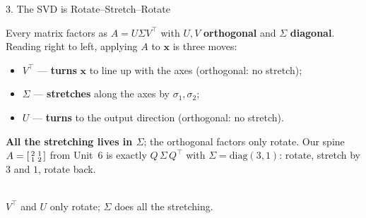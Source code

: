 \documentclass[10pt]{article}
\newcommand{\xx}{\mathbf{x}}
\newcommand{\T}{^{\top}}
\begin{document}
\begin{notesbox}{3. The SVD is Rotate--Stretch--Rotate}
\begin{minipage}[t]{0.52\linewidth}\vspace{0pt}
Every matrix factors as $A=U\Sigma V\T$ with $U,V$ \textbf{orthogonal} and $\Sigma$ \textbf{diagonal}. Reading
right to left, applying $A$ to $\xx$ is three moves:
\begin{itemize}[leftmargin=1.2em, nosep]
  \item $V\T$ --- \textbf{turns} $\xx$ to line up with the axes (orthogonal: no stretch);
  \item $\Sigma$ --- \textbf{stretches} along the axes by $\sigma_1,\sigma_2$;
  \item $U$ --- \textbf{turns} to the output direction (orthogonal: no stretch).
\end{itemize}
\vspace{2pt}
\textbf{All the stretching lives in $\Sigma$}; the orthogonal factors only rotate. Our spine
$A=\begin{bsmallmatrix} 2 & 1\\ 1 & 2 \end{bsmallmatrix}$ from Unit~6 is exactly
$Q\,\Sigma\,Q\T$ with $\Sigma=\mathrm{diag}(3,1)$: rotate, stretch by $3$ and $1$, rotate back.
\end{minipage}\hfill
\begin{minipage}[t]{0.44\linewidth}\vspace{0pt}
\centering
{}\\[3pt]
{\scriptsize $V\T$ and $U$ only rotate; $\Sigma$ does all the stretching.}
\end{minipage}
\end{notesbox}
\end{document}
